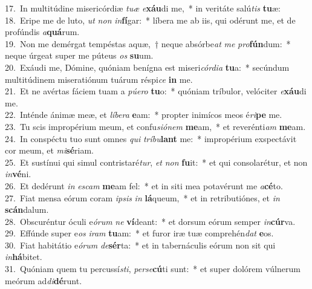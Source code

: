 {17.~}In multitúdine misericórdiæ \textit{tu}\textit{æ} \textit{e}\textbf{xáu}di me,~* in veritáte salú\textit{tis} \textbf{tu}æ:\\
{18.~}Eripe me de luto, \textit{ut} \textit{non} \textit{in}\textbf{fí}gar:~* líbera me ab iis, qui odérunt me, et de profúndis \textit{a}\textbf{quá}rum.\\
{19.~}Non me demérgat tempéstas aquæ,~† neque absórbe\textit{at} \textit{me} \textit{pro}\textbf{fún}dum:~* neque úrgeat super me púteus \textit{os} \textbf{su}um.\\
{20.~}Exáudi me, Dómine, quóniam benígna est miseri\textit{cór}\textit{di}\textit{a} \textbf{tu}a:~* secúndum multitúdinem miseratiónum tuárum réspi\textit{ce} \textbf{in} me.\\
{21.~}Et ne avértas fáciem tuam a \textit{pú}\textit{e}\textit{ro} \textbf{tu}o:~* quóniam tríbulor, velóciter \textit{e}\textbf{xáu}di me.\\
{22.~}Inténde ánimæ meæ, et \textit{lí}\textit{be}\textit{ra} \textbf{e}am:~* propter inimícos meos é\textit{ri}\textbf{pe} me.\\
{23.~}Tu scis impropérium meum, et confu\textit{si}\textit{ó}\textit{nem} \textbf{me}am,~* et reverénti\textit{am} \textbf{me}am.\\
{24.~}In conspéctu tuo sunt omnes \textit{qui} \textit{trí}\textit{bu}\textbf{lant} me:~* impropérium exspectávit cor meum, et \textit{mi}\textbf{sé}riam.\\
{25.~}Et sustínui qui simul contristaré\textit{tur}, \textit{et} \textit{non} \textbf{fu}it:~* et qui consolarétur, et non \textit{in}\textbf{vé}ni.\\
{26.~}Et dedérunt \textit{in} \textit{e}\textit{scam} \textbf{me}am fel:~* et in siti mea potavérunt me \textit{a}\textbf{cé}to.\\
{27.~}Fiat mensa eórum coram \textit{i}\textit{psis} \textit{in} \textbf{lá}queum,~* et in retributiónes, et \textit{in} \textbf{scán}dalum.\\
{28.~}Obscuréntur óculi e\textit{ó}\textit{rum} \textit{ne} \textbf{ví}deant:~* et dorsum eórum semper \textit{in}\textbf{cúr}va.\\
{29.~}Effúnde super e\textit{os} \textit{i}\textit{ram} \textbf{tu}am:~* et furor iræ tuæ comprehén\textit{dat} \textbf{e}os.\\
{30.~}Fiat habitátio e\textit{ó}\textit{rum} \textit{de}\textbf{sér}ta:~* et in tabernáculis eórum non sit qui \textit{in}\textbf{há}bitet.\\
{31.~}Quóniam quem tu percussí\textit{sti}, \textit{per}\textit{se}\textbf{cú}ti sunt:~* et super dolórem vúlnerum meórum ad\textit{di}\textbf{dé}runt.\\
